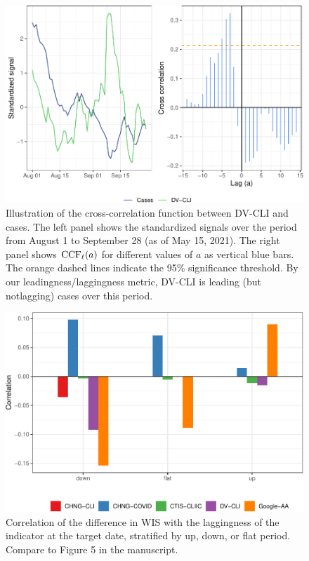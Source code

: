 \documentclass[9pt,twoside,lineno]{pnas-new}
\begin{document}
\begin{figure}

{\centering \includegraphics[width=\textwidth]{fig/ccf-dv-finalized-1} 

}

\caption{Illustration of the cross-correlation function between DV-CLI and cases. The left panel shows the standardized signals over the period from August 1 to September 28 (as of May 15, 2021). The right panel shows $\mathrm{CCF}_{\ell}(a)$ for different values of $a$ as vertical blue bars. The orange dashed lines indicate the 95\% significance threshold. By our leadingness/laggingness metric, DV-CLI is leading (but notlagging) cases over this period.}\label{fig:ccf-dv-finalized}
\end{figure}

\clearpage

\begin{figure}

{\centering \includegraphics[width=\textwidth]{fig/lagging-only-1} 

}

\caption{Correlation of the difference in WIS with the  laggingness of the indicator at the target date, stratified by up, down, or flat period. Compare to Figure 5 in the manuscript.}\label{fig:lagging-only}
\end{figure}
\end{document}
